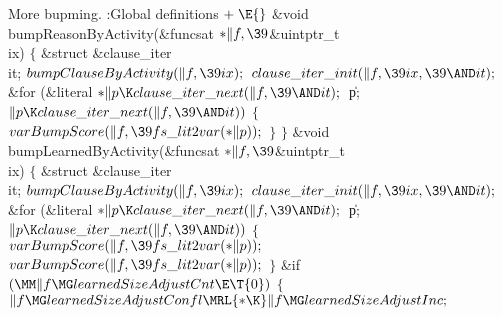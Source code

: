 {{{{{More bupming.
\Y\B\4:Global definitions\X${}\mathrel+\E{}$\6
\&{void} \\{bumpReasonByActivity}(\&{funcsat} ${}{*}\|f,\39{}$\&{uintptr\_t} %
\\{ix})\1\1\2\2\6
${}\{{}$\1\6
\&{struct} \&{clause\_iter} \\{it};\7
${}\\{bumpClauseByActivity}(\|f,\39\\{ix});{}$\6
${}\\{clause\_iter\_init}(\|f,\39\\{ix},\39{\AND}\\{it});{}$\6
\&{for} (\&{literal} ${}{*}\|p\K\\{clause\_iter\_next}(\|f,\39{\AND}\\{it});{}$
\|p; ${}\|p\K\\{clause\_iter\_next}(\|f,\39{\AND}\\{it})){}$\5
${}\{{}$\1\6
${}\\{varBumpScore}(\|f,\39\\{fs\_lit2var}({*}\|p));{}$\6
\4${}\}{}$\2\6
\4${}\}{}$\2\7
\&{void} \\{bumpLearnedByActivity}(\&{funcsat} ${}{*}\|f,\39{}$\&{uintptr\_t} %
\\{ix})\1\1\2\2\6
${}\{{}$\1\6
\&{struct} \&{clause\_iter} \\{it};\7
${}\\{bumpClauseByActivity}(\|f,\39\\{ix});{}$\6
${}\\{clause\_iter\_init}(\|f,\39\\{ix},\39{\AND}\\{it});{}$\6
\&{for} (\&{literal} ${}{*}\|p\K\\{clause\_iter\_next}(\|f,\39{\AND}\\{it});{}$
\|p; ${}\|p\K\\{clause\_iter\_next}(\|f,\39{\AND}\\{it})){}$\5
${}\{{}$\1\6
${}\\{varBumpScore}(\|f,\39\\{fs\_lit2var}({*}\|p));{}$\6
${}\\{varBumpScore}(\|f,\39\\{fs\_lit2var}({*}\|p));{}$\6
\4${}\}{}$\2\6
\&{if} ${}(\MM\|f\MG\\{learnedSizeAdjustCnt}\E\T{0}){}$\5
${}\{{}$\1\6
${}\|f\MG\\{learnedSizeAdjustConfl}\MRL{*{\K}}\|f\MG%
\\{learnedSizeAdjustInc};{}$\6
}}}}}
